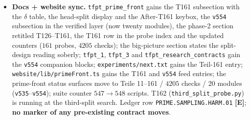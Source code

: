 \documentclass[11pt]{article}
\providecommand{\mE}{\textbf{[E]}}\providecommand{\mC}{\textbf{[C]}}
\begin{document}
\begin{itemize}[leftmargin=1.5em]
(\texttt{third\_split\_probe.py}), running, searches for one split with
$\delta_{\mathrm{eff}}<\tfrac12$. NOT RH evidence; no marker moves.
\item \textbf{Docs + website sync.} \texttt{tfpt\_prime\_front} gains the T161
subsection with the $\delta$ table, the head-split display and the After-T161 keybox,
the \texttt{v554} subsection in the verified layer (now twenty modules), the phase-2
section retitled T126--T161, the T161 row in the probe index and the updated counters
($161$ probes, $4205$ checks); the big-picture section states the split-design reading
soberly; \texttt{tfpt\_1}, \texttt{tfpt\_3} and \texttt{tfpt\_research\_contracts} gain
the \texttt{v554} companion blocks; \texttt{experiments/next.txt} gains the Teil-161
entry; \texttt{website/lib/primeFront.ts} gains the T161 and \texttt{v554} feed entries;
the prime-front status surfaces move to Teile 11--161 / $4205$ checks / 20 modules
(\texttt{v535}--\texttt{v554}); suite counter $547\to548$ scripts. T162
(\texttt{third\_split\_probe.py}) is running at the third-split search. Ledger row
\texttt{PRIME.SAMPLING.HARM.01} \mE; \textbf{no marker of any pre-existing contract
moves}.
\end{itemize}
\end{document}
